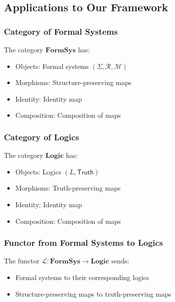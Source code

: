 \subsection{Applications to Our Framework}

\subsubsection{Category of Formal Systems}

\begin{definition}
The category $\mathbf{FormSys}$ has:
\begin{itemize}
\item Objects: Formal systems $(\Sigma, \mathcal{R}, \mathcal{M})$
\item Morphisms: Structure-preserving maps
\item Identity: Identity map
\item Composition: Composition of maps
\end{itemize}
\end{definition}

\subsubsection{Category of Logics}

\begin{definition}
The category $\mathbf{Logic}$ has:
\begin{itemize}
\item Objects: Logics $(L, \mathsf{Truth})$
\item Morphisms: Truth-preserving maps
\item Identity: Identity map
\item Composition: Composition of maps
\end{itemize}
\end{definition}

\subsubsection{Functor from Formal Systems to Logics}

\begin{definition}
The functor $\mathcal{L}: \mathbf{FormSys} \to \mathbf{Logic}$ sends:
\begin{itemize}
\item Formal systems to their corresponding logics
\item Structure-preserving maps to truth-preserving maps
\end{itemize}
\end{definition}

